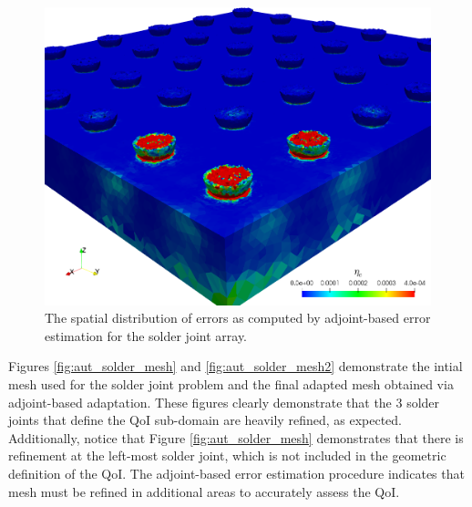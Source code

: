 \begin{figure}[ht!]
\centering
\includegraphics[width=.5\linewidth]{img/aut_solder_error.png}
\caption{The spatial distribution of errors as computed by
adjoint-based error estimation for the solder joint array.}
\label{fig:aut_solder_error}
\end{figure}

Figures \ref{fig:aut_solder_mesh} and \ref{fig:aut_solder_mesh2}
demonstrate the intial mesh used for the solder joint problem
and the final adapted mesh obtained via adjoint-based adaptation.
These figures clearly demonstrate that the 3 solder joints
that define the QoI sub-domain are heavily refined, as expected.
Additionally, notice that Figure \ref{fig:aut_solder_mesh}
demonstrates that there is refinement at the left-most solder joint,
which is not included in the geometric definition of the QoI.
The adjoint-based error estimation procedure indicates that
mesh must be refined in additional areas to accurately assess
the QoI.

